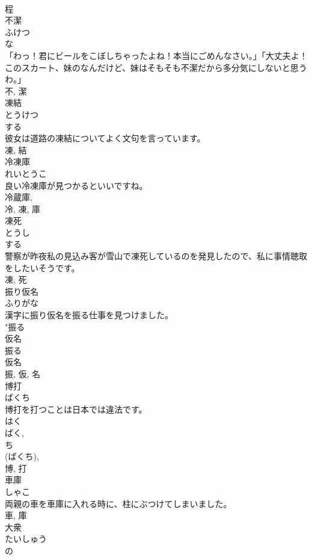 \documentclass[8pt]{extreport}
\begin{document}
\begin{CJK}{UTF8}{min}
\\	程	
\\	不潔	
\\	ふけつ	
\\	な 
\\	「わっ！君にビールをこぼしちゃったよね！本当にごめんなさい。」「大丈夫よ！このスカート、妹のなんだけど、妹はそもそも不潔だから多分気にしないと思うわ。」	
\\	不, 潔	
\\	凍結	
\\	とうけつ	
\\	する 
\\	彼女は道路の凍結についてよく文句を言っています。	
\\	凍, 結	
\\	冷凍庫	
\\	れいとうこ	
\\	良い冷凍庫が見つかるといいですね。	
\\	冷蔵庫, 
\\	冷, 凍, 庫	
\\	凍死	
\\	とうし	
\\	する 
\\	警察が昨夜私の見込み客が雪山で凍死しているのを発見したので、私に事情聴取をしたいそうです。	
\\	凍, 死	
\\	振り仮名	
\\	ふりがな	
\\	漢字に振り仮名を振る仕事を見つけました。	
\\	"振る 
\\	仮名 
\\	振る 
\\	仮名 
\\	振, 仮, 名	
\\	博打	
\\	ばくち	
\\	博打を打つことは日本では違法です。	
\\	はく 
\\	ばく, 
\\	ち 
\\	(ばくち), 
\\	博, 打	
\\	車庫	
\\	しゃこ	
\\	両親の車を車庫に入れる時に、柱にぶつけてしまいました。	
\\	車, 庫	
\\	大衆	
\\	たいしゅう	
\\	の 

\end{CJK}
\end{document}
